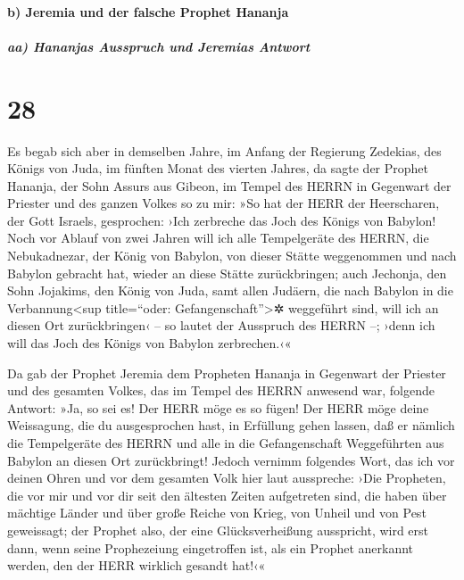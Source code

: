 \hypertarget{b-jeremia-und-der-falsche-prophet-hananja}{%
\paragraph{b) Jeremia und der falsche Prophet
Hananja}\label{b-jeremia-und-der-falsche-prophet-hananja}}

\hypertarget{aa-hananjas-ausspruch-und-jeremias-antwort}{%
\subparagraph{aa) Hananjas Ausspruch und Jeremias
Antwort}\label{aa-hananjas-ausspruch-und-jeremias-antwort}}

\hypertarget{section-27}{%
\section{28}\label{section-27}}

Es begab sich aber in demselben Jahre, im Anfang der
Regierung Zedekias, des Königs von Juda, im fünften Monat des vierten
Jahres, da sagte der Prophet Hananja, der Sohn Assurs aus Gibeon, im
Tempel des HERRN in Gegenwart der Priester und des ganzen Volkes so zu
mir: »So hat der HERR der Heerscharen, der Gott Israels,
gesprochen: ›Ich zerbreche das Joch des Königs von Babylon!
Noch vor Ablauf von zwei Jahren will ich alle Tempelgeräte
des HERRN, die Nebukadnezar, der König von Babylon, von dieser Stätte
weggenommen und nach Babylon gebracht hat, wieder an diese Stätte
zurückbringen; auch Jechonja, den Sohn Jojakims, den König
von Juda, samt allen Judäern, die nach Babylon in die
Verbannung\textless sup title=``oder: Gefangenschaft''\textgreater✲
weggeführt sind, will ich an diesen Ort zurückbringen‹ -- so lautet der
Ausspruch des HERRN --; ›denn ich will das Joch des Königs von Babylon
zerbrechen.‹«

Da gab der Prophet Jeremia dem Propheten Hananja in
Gegenwart der Priester und des gesamten Volkes, das im Tempel des HERRN
anwesend war, folgende Antwort: »Ja, so sei es! Der HERR
möge es so fügen! Der HERR möge deine Weissagung, die du ausgesprochen
hast, in Erfüllung gehen lassen, daß er nämlich die Tempelgeräte des
HERRN und alle in die Gefangenschaft Weggeführten aus Babylon an diesen
Ort zurückbringt! Jedoch vernimm folgendes Wort, das ich
vor deinen Ohren und vor dem gesamten Volk hier laut ausspreche:
›Die Propheten, die vor mir und vor dir seit den ältesten
Zeiten aufgetreten sind, die haben über mächtige Länder und über große
Reiche von Krieg, von Unheil und von Pest geweissagt; der
Prophet also, der eine Glücksverheißung ausspricht, wird erst dann, wenn
seine Prophezeiung eingetroffen ist, als ein Prophet anerkannt werden,
den der HERR wirklich gesandt hat!‹«

